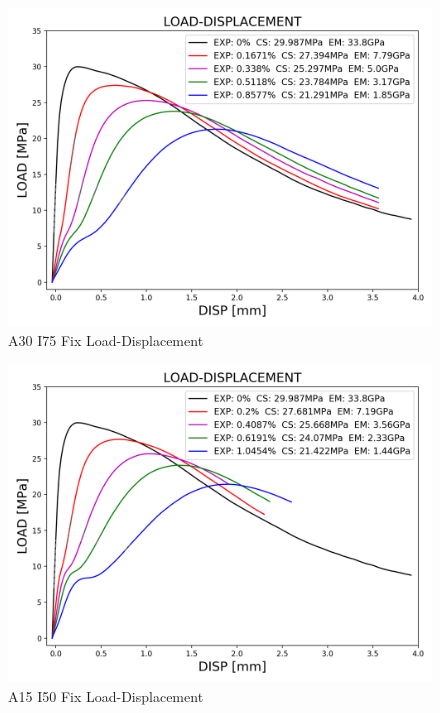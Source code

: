 
\begin{figure}[ht!]
\centering
\includegraphics[width=.8\linewidth]{Files/exp_3D/DEF/S13A30FIXX-5-LOAD-DISPLACEMENT.png}
  \caption{A30 I75 Fix Load-Displacement}
  \label{fig:A30X-5FIX_LD}
\end{figure}


\begin{figure}[ht!]
\centering
\includegraphics[width=.8\linewidth]{Files/exp_3D/DEF/S13A30FIXX-1-LOAD-DISPLACEMENT.png}
  \caption{A15 I50 Fix Load-Displacement}
  \label{fig:A30X-1asdasdaFIX_LD}
\end{figure}


